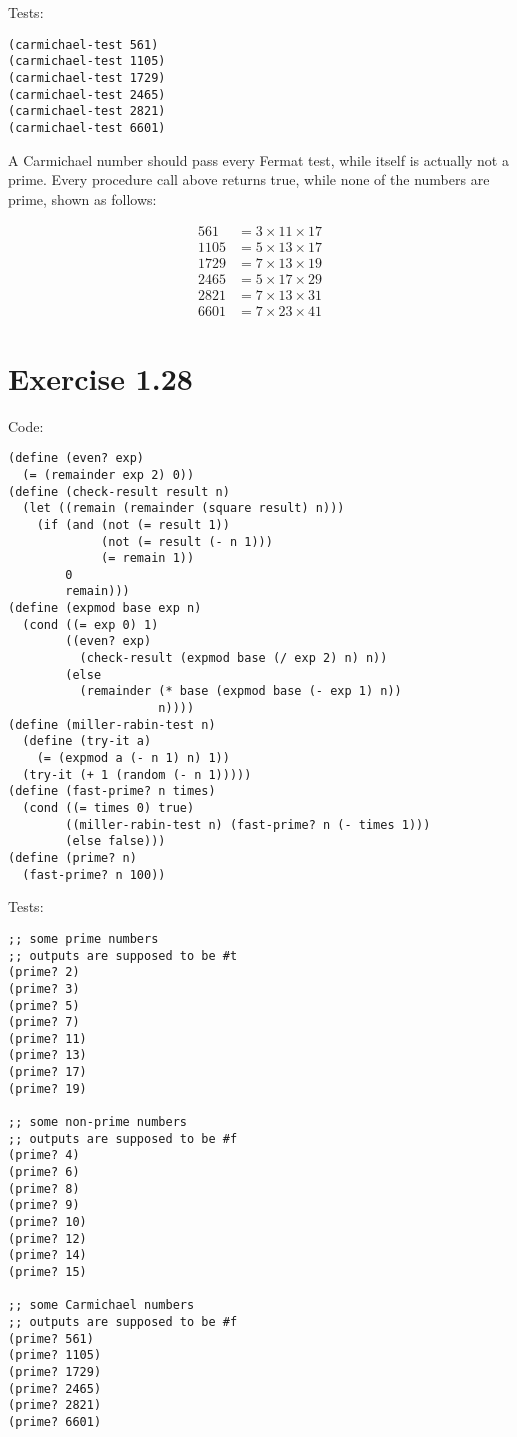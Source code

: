 \documentclass[../main.tex]{subfiles}
\begin{document}
Tests:

\begin{lstlisting}
(carmichael-test 561)
(carmichael-test 1105)
(carmichael-test 1729)
(carmichael-test 2465)
(carmichael-test 2821)
(carmichael-test 6601)
\end{lstlisting}

A Carmichael number should pass every Fermat test, while
 itself is actually not a prime. Every procedure call above
 returns true, while none of the numbers are prime, shown
 as follows:

\begin{align*}
561 &= 3 \times 11 \times 17 \\
1105 &= 5 \times 13 \times 17 \\
1729 &= 7 \times 13 \times 19 \\
2465 &= 5 \times 17 \times 29 \\
2821 &= 7 \times 13 \times 31 \\
6601 &= 7 \times 23 \times 41
\end{align*}

\section{Exercise 1.28}

Code:

\begin{lstlisting}
(define (even? exp)
  (= (remainder exp 2) 0))
(define (check-result result n)
  (let ((remain (remainder (square result) n)))
    (if (and (not (= result 1))
             (not (= result (- n 1)))
             (= remain 1))
        0
        remain)))
(define (expmod base exp n)
  (cond ((= exp 0) 1)
        ((even? exp)
          (check-result (expmod base (/ exp 2) n) n))
        (else
          (remainder (* base (expmod base (- exp 1) n))
                     n))))
(define (miller-rabin-test n)
  (define (try-it a)
    (= (expmod a (- n 1) n) 1))
  (try-it (+ 1 (random (- n 1)))))
(define (fast-prime? n times)
  (cond ((= times 0) true)
        ((miller-rabin-test n) (fast-prime? n (- times 1)))
        (else false)))
(define (prime? n)
  (fast-prime? n 100))
\end{lstlisting}

Tests:

\begin{lstlisting}
;; some prime numbers
;; outputs are supposed to be #t
(prime? 2)
(prime? 3)
(prime? 5)
(prime? 7)
(prime? 11)
(prime? 13)
(prime? 17)
(prime? 19)

;; some non-prime numbers
;; outputs are supposed to be #f
(prime? 4)
(prime? 6)
(prime? 8)
(prime? 9)
(prime? 10)
(prime? 12)
(prime? 14)
(prime? 15)

;; some Carmichael numbers
;; outputs are supposed to be #f
(prime? 561)
(prime? 1105)
(prime? 1729)
(prime? 2465)
(prime? 2821)
(prime? 6601)
\end{lstlisting}
\end{document}
